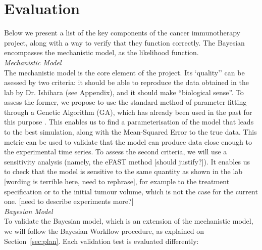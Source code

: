 \documentclass[11pt]{article}
\begin{document}
\section{Evaluation}
Below we present a list of the key components of the cancer immunotherapy project, along with a way to verify that they function correctly. The Bayesian encompasses the mechanistic model, as the likelihood function. \\[11pt]
%
\textit{Mechanistic Model}\\[3pt] %
The mechanistic model is the core element of the project. Its `quality'' can be asessed by two criteria: it should be able to reproduce the data obtained in the lab by Dr. Ishihara (see Appendix), and it should make ``biological sense''. To assess the former, we propose to use the standard method of parameter fitting through a Genetic Algorithm (GA), which has already been used in the past for this purpose \cite{christian2}. This enables us to find a parameterisation of the model that leads to the best simulation, along with the Mean-Squared Error to the true data. This metric can be used to validate that the model can produce data close enough to the experimental time series. To assess the second criteria, we will use a sensitivity analysis (namely, the eFAST method [should justify?]). It enables us to check that the model is sensitive to the same quantity as shown in the lab [wording is terrible here, need to rephrase], for example to the treatment specification or to the initial tumour volume, which is not the case for the current one. [need to describe experiments more?]\\[11pt]
%
\textit{Bayesian Model}\\[3pt]
To validate the Bayesian model, which is an extension of the mechanistic model, we will follow the Bayesian Workflow procedure, as explained on Section~\ref{sec:plan}. Each validation test is evaluated differently:
\end{document}
